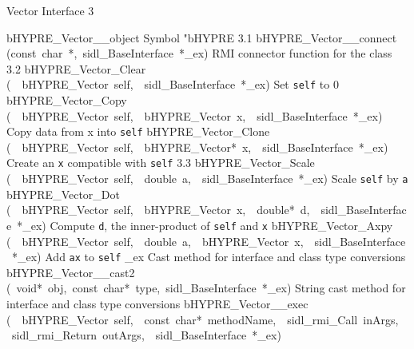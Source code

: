 \documentclass{article}
\begin{document}
\begin{cxxentry}
{}
        {Vector Interface}
        {}
        {
}
        {3}
\begin{cxxnames}
        {bHYPRE\_Vector\_\_object}
        {}
        {
Symbol "bHYPRE}
        {3.1}
        {bHYPRE\_Vector\_\_connect}
        {(const\ char\ *,\ sidl\_BaseInterface\ *\_ex)}
        {
RMI connector function for the class}
        {3.2}
        {bHYPRE\_Vector\_Clear}
        {(\ \ bHYPRE\_Vector\ self,\ \ sidl\_BaseInterface\ *\_ex)}
        {
Set {\tt self} to 0}
        {}
\label{cxx.3.5}
        {bHYPRE\_Vector\_Copy}
        {(\ \ bHYPRE\_Vector\ self,\ \ bHYPRE\_Vector\ x,\ \ sidl\_BaseInterface\ *\_ex)}
        {
Copy data from x into {\tt self}}
        {}
\label{cxx.3.6}
        {bHYPRE\_Vector\_Clone}
        {(\ \ bHYPRE\_Vector\ self,\ \ bHYPRE\_Vector*\ x,\ \ sidl\_BaseInterface\ *\_ex)}
        {
Create an {\tt x} compatible with {\tt self}}
        {3.3}
        {bHYPRE\_Vector\_Scale}
        {(\ \ bHYPRE\_Vector\ self,\ \ double\ a,\ \ sidl\_BaseInterface\ *\_ex)}
        {
Scale {\tt self} by {\tt a}}
        {}
\label{cxx.3.7}
        {bHYPRE\_Vector\_Dot}
        {(\ \ bHYPRE\_Vector\ self,\ \ bHYPRE\_Vector\ x,\ \ double*\ d,\ \ sidl\_BaseInterface\ *\_ex)}
        {
Compute {\tt d}, the inner-product of {\tt self} and {\tt x}}
        {}
\label{cxx.3.8}
        {bHYPRE\_Vector\_Axpy}
        {(\ \ bHYPRE\_Vector\ self,\ \ double\ a,\ \ bHYPRE\_Vector\ x,\ \ sidl\_BaseInterface\ *\_ex)}
        {
Add {\tt a}{\tt x} to {\tt self}}
        {}
\label{cxx.3.9}
        {\_ex}
        {}
        {
Cast method for interface and class type conversions}
        {}
\label{cxx.3.10}
        {bHYPRE\_Vector\_\_cast2}
        {(\ void*\ obj,\ const\ char*\ type,\ sidl\_BaseInterface\ *\_ex)}
        {
String cast method for interface and class type conversions}
        {}
\label{cxx.3.11}
        {bHYPRE\_Vector\_\_exec}
        {(\ \ bHYPRE\_Vector\ self,\ \ const\ char*\ methodName,\ \ sidl\_rmi\_Call\ inArgs,\ \ sidl\_rmi\_Return\ outArgs,\ \ sidl\_BaseInterface\ *\_ex)}

\end{cxxnames}
\end{cxxentry}
\end{document}
